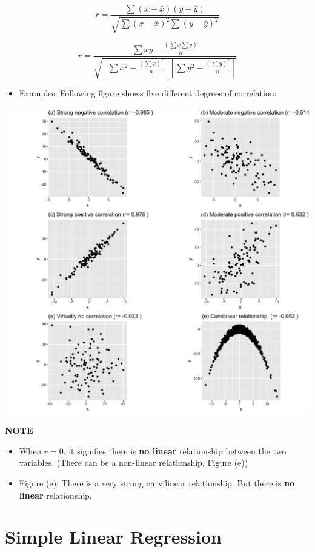 \documentclass[]{book}
\providecommand{\tightlist}{%
  \setlength{\itemsep}{0pt}\setlength{\parskip}{0pt}}
\begin{document}
\[ r = \frac{\sum(x-\bar{x})(y-\bar{y})}{\sqrt{\sum(x-\bar{x})^2\sum(y-\bar{y})^2}}\]

\[ r = \frac{\sum{xy} - \frac{(\sum x\sum y)}{n}}{\sqrt{[\sum{x^2- \frac{(\sum{x})^2}{n}}][\sum y^2-\frac{(\sum y)^2}{n}]}}\]

\begin{itemize}
\tightlist
\item
  Examples: Following figure shows five different degrees of correlation:
\end{itemize}

\begin{center}\includegraphics[width=1\linewidth]{figure/cor2-1} \end{center}

\textbf{NOTE}

\begin{itemize}
\tightlist
\item
  When \(r=0\), it signifies there is \textbf{no linear} relationship between the two variables. (There can be a non-linear relationship, Figure (e))
\item
  Figure (e): There is a very strong curvilinear relationship. But there is \textbf{no linear} relationship.
\end{itemize}

\hypertarget{simple-linear-regression}{%
\section{Simple Linear Regression}\label{simple-linear-regression}}
\end{document}
